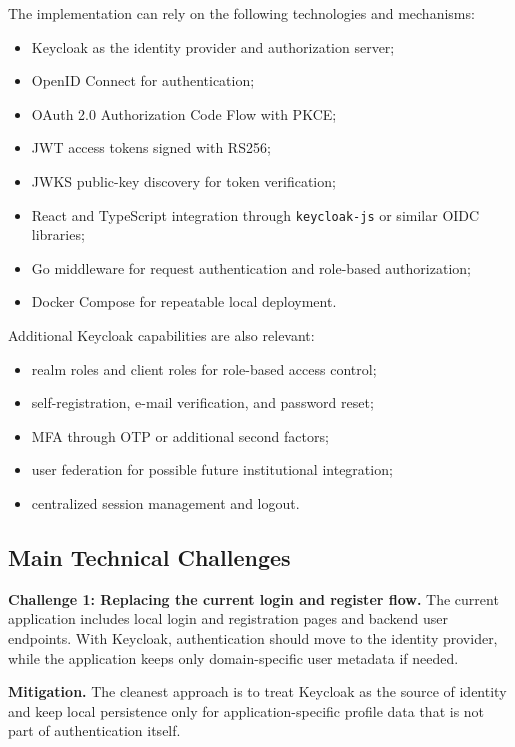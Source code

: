 \documentclass[conference]{IEEEtran}
\begin{document}
The implementation can rely on the following technologies and mechanisms:

\begin{itemize}
\item Keycloak as the identity provider and authorization server;
\item OpenID Connect for authentication;
\item OAuth 2.0 Authorization Code Flow with PKCE;
\item JWT access tokens signed with RS256;
\item JWKS public-key discovery for token verification;
\item React and TypeScript integration through \texttt{keycloak-js} or similar OIDC libraries;
\item Go middleware for request authentication and role-based authorization;
\item Docker Compose for repeatable local deployment.
\end{itemize}

Additional Keycloak capabilities are also relevant:

\begin{itemize}
\item realm roles and client roles for role-based access control;
\item self-registration, e-mail verification, and password reset;
\item MFA through OTP or additional second factors;
\item user federation for possible future institutional integration;
\item centralized session management and logout.
\end{itemize}

\subsection{Main Technical Challenges}

\textbf{Challenge 1: Replacing the current login and register flow.} The current application includes local login and registration pages and backend user endpoints. With Keycloak, authentication should move to the identity provider, while the application keeps only domain-specific user metadata if needed.

\textbf{Mitigation.} The cleanest approach is to treat Keycloak as the source of identity and keep local persistence only for application-specific profile data that is not part of authentication itself.
\end{document}
